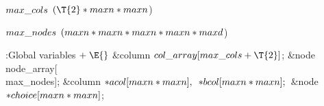 \B\D$\\{max\_cols}$ \5
$(\T{2}*\\{maxn}*\\{maxn}{}$)\par
\B\4\D$\\{max\_nodes}$ \5
$(\\{maxn}*\\{maxn}*\\{maxn}*\\{maxn}*\\{maxd}{}$)\par
\Y\B\4:Global variables\X${}\mathrel+\E{}$\6
\&{column} ${}\\{col\_array}[\\{max\_cols}+\T{2}]{}$;\6
\&{node} \\{node\_array}[\\{max\_nodes}];\6
\&{column} ${}{*}\\{acol}[\\{maxn}*\\{maxn}],{}$ ${}{*}\\{bcol}[\\{maxn}*%
\\{maxn}];{}$\6
\&{node} ${}{*}\\{choice}[\\{maxn}*\\{maxn}]{}$;\par
\fi

